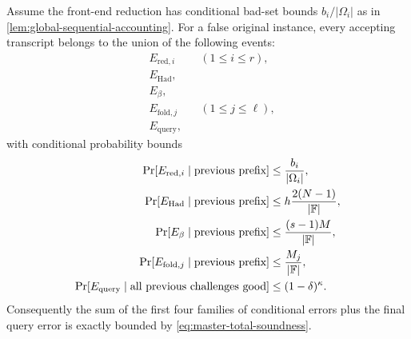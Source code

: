 \begin{proposition}
\label{prop:sequential-knowledge-profile}
Assume the front-end reduction has conditional bad-set bounds $b_i/|\Omega_i|$ as in \cref{lem:global-sequential-accounting}.  For a false original instance, every accepting transcript belongs to the union of the following events:
\begin{equation}
\begin{aligned}
  &E_{\mathrm{red},i}
  &&(1\le i\le r),\\
  &E_{\mathrm{Had}},\\
  &E_{\beta},\\
  &E_{\mathrm{fold},j}
  &&(1\le j\le\ell),\\
  &E_{\mathrm{query}},
\end{aligned}
\label{eq:global-failure-events}
\end{equation}
with conditional probability bounds
\begin{equation}
\begin{aligned}
  \Pr[E_{\mathrm{red},i}\mid\text{previous prefix}]&\le \frac{b_i}{|\Omega_i|},\\
  \Pr[E_{\mathrm{Had}}\mid\text{previous prefix}]&\le h\frac{2(N-1)}{|\mathbb{F}|},\\
  \Pr[E_{\beta}\mid\text{previous prefix}]&\le \frac{(s-1)M}{|\mathbb{F}|},\\
  \Pr[E_{\mathrm{fold},j}\mid\text{previous prefix}]&\le \frac{M_j}{|\mathbb{F}|},\\
  \Pr[E_{\mathrm{query}}\mid\text{all previous challenges good}]&\le(1-\delta)^\kappa.
\end{aligned}
\label{eq:global-failure-profile}
\end{equation}
Consequently the sum of the first four families of conditional errors plus the final query error is exactly bounded by \eqref{eq:master-total-soundness}.
\end{proposition}

